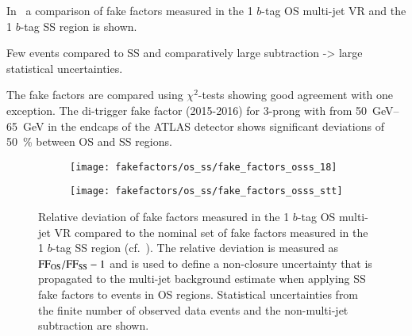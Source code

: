 In~ a comparison of fake factors measured
in the 1 $b$-tag OS multi-jet VR and the 1 $b$-tag SS region is
shown.

Few events compared to SS and comparatively large subtraction -> large
statistical uncertainties.

The fake factors are compared using $\chi^2$-tests showing good
agreement with one exception. The di-\tauhadvis trigger fake factor
(2015-2016) for 3-prong \tauhadvis with \pT from
\SIrange{50}{65}{\GeV} in the endcaps of the ATLAS detector shows
significant deviations of \SI{50}{\percent} between OS and SS regions.



%

\begin{figure}[htbp]
  \centering

  \begin{subfigure}[t]{0.48\textwidth}
    \texttt{[image: fakefactors/os\_ss/fake\_factors\_osss\_18]}
  \end{subfigure}\hfill%
  \begin{subfigure}[t]{0.48\textwidth}
    \texttt{[image: fakefactors/os\_ss/fake\_factors\_osss\_stt]}
  \end{subfigure}

  \caption{Relative deviation of fake factors measured in the 1
    $b$-tag OS multi-jet VR compared to the nominal set of fake
    factors measured in the 1 $b$-tag SS region (cf.\
    ). The relative
    deviation is measured as $\text{FF}_\text{OS} / \text{FF}_\text{SS} - 1$ and
    is used to define a non-closure uncertainty that is propagated to
    the multi-jet background estimate when applying SS fake factors to
    events in OS regions. Statistical uncertainties from the finite
    number of observed data events and the non-multi-jet subtraction
    are shown.}
  \label{fig:fake_factor_OSSS}
\end{figure}





